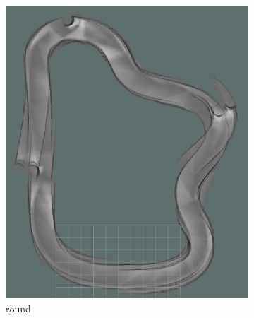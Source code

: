 \begin{figure}[H]
	\centering
	\begin{subfigure}{.3\linewidth}
		\includegraphics[width=\textwidth]{Pictures/3slamtest1}
		\caption{ round}
		\end{subfigure}	
	\begin{subfigure}{.3\linewidth}

\end{subfigure}
\end{figure}
